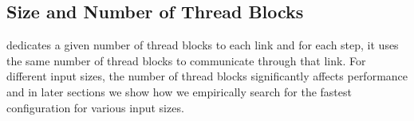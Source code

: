 \subsection{Size and Number of Thread Blocks} \tool{} dedicates a
given number of thread blocks to each link and for each step, it uses
the same number of thread blocks to communicate through that link. For
different input sizes, the number of thread blocks significantly
affects performance and in later sections we show how we empirically
search for the fastest configuration for various input sizes.




